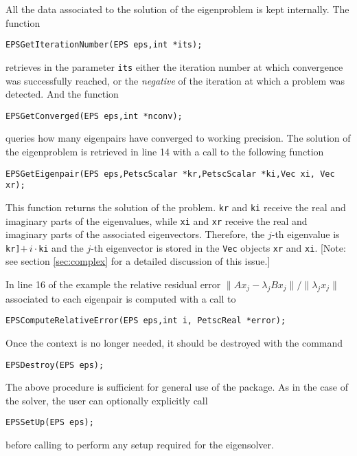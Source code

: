         All the data associated to the solution of the eigenproblem is kept internally. The function
	\begin{Verbatim}[fontsize=\small]
        EPSGetIterationNumber(EPS eps,int *its);
	\end{Verbatim}
        retrieves in the parameter \texttt{its} either the iteration number at which convergence was successfully reached, or the \emph{negative} of the iteration at which a problem was detected. And the function
	\begin{Verbatim}[fontsize=\small]
	EPSGetConverged(EPS eps,int *nconv);
	\end{Verbatim}
	queries how many eigenpairs have converged to working precision. The solution of the eigenproblem is retrieved in line 14 with a call to the following function
	\begin{Verbatim}[fontsize=\small]
	EPSGetEigenpair(EPS eps,PetscScalar *kr,PetscScalar *ki,Vec xi, Vec xr);
	\end{Verbatim}
	\label{GetEigenpair}
	This function returns the solution of the problem. \texttt{kr} and \texttt{ki} receive the real and imaginary parts of the eigenvalues, while \texttt{xi} and \texttt{xr} receive the real and imaginary parts of the associated eigenvectors. Therefore, the $j$-th eigenvalue is \texttt{kr]}$+\,i\cdot$\texttt{ki} and the $j$-th eigenvector is stored in the \texttt{Vec} objects \texttt{xr} and \texttt{xi}. 
	[Note: see section \ref{sec:complex} for a detailed discussion of this issue.] 
	
	In line 16 of the example the relative residual error $\|Ax_j\!-\!\lambda_jBx_j\|/\|\lambda_jx_j\|$ associated to each eigenpair is computed with a call to
	\begin{Verbatim}[fontsize=\small]
	EPSComputeRelativeError(EPS eps,int i, PetscReal *error);
	\end{Verbatim}

	Once the  context is no longer needed, it should be destroyed with the command
	\begin{Verbatim}[fontsize=\small]
	EPSDestroy(EPS eps);
	\end{Verbatim}

	The above procedure is sufficient for general use of the  package. As in the case of the  solver, the user can optionally explicitly call 
	\begin{Verbatim}[fontsize=\small]
	EPSSetUp(EPS eps);
	\end{Verbatim}
before calling  to perform any setup required for the eigensolver.

